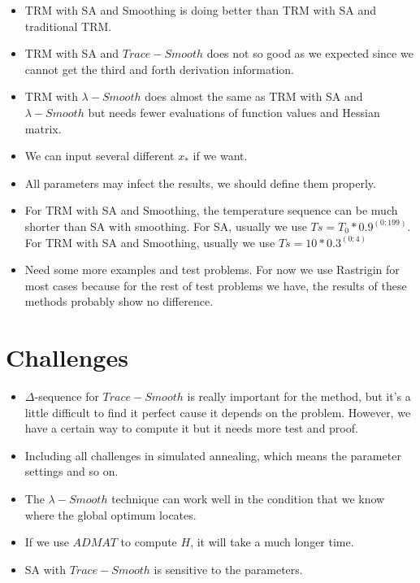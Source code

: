 \documentclass[letterpaper,12pt,titlepage,oneside,final]{book}
\begin{document}
\begin{itemize}

\item TRM with SA and Smoothing is doing better than TRM with SA and traditional TRM.

\item TRM with SA and $Trace-Smooth$ does not so good as we expected since we cannot get the third and forth derivation information.

\item TRM with $\lambda-Smooth$ does almost the same as TRM with SA and $\lambda-Smooth$ but needs fewer evaluations of function values and Hessian matrix.

\item We can input several different $x_*$ if we want.

\item All parameters may infect the results, we should define them properly.

\item For TRM with SA and Smoothing, the temperature sequence can be much shorter than SA with smoothing. For SA, usually we use $Ts=T_0*0.9^{(0:199)}$. For TRM with SA and Smoothing, usually we use $Ts=10*0.3^{(0:4)}$

\item Need some more examples and test problems. For now we use Rastrigin for most cases because for the rest of test problems we have, the results of these methods probably show no difference. 

\end{itemize}

\section{Challenges}

\begin{itemize}

\item $\Delta$-sequence for $Trace-Smooth$ is really important for the method, but it's a little difficult to find it perfect cause it depends on the problem. However, we have a certain way to compute it but it needs more test and proof. 

\item Including all challenges in simulated annealing, which means the parameter settings and so on.

\item The $\lambda-Smooth$ technique can work well in the condition that we know where the global optimum locates.

\item If we use $ADMAT$ to compute $H$, it will take a much longer time.

\item SA with $Trace-Smooth$ is sensitive to the parameters.

\end{itemize}
\end{document}
